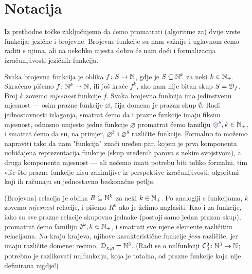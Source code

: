 \section{Notacija}

Iz prethodne točke zaključujemo da ćemo promatrati (algoritme za) dvije vrste funkcija: jezične i brojevne. Brojevne funkcije su nam važnije i uglavnom ćemo raditi s njima, ali na nekoliko mjesta dobro će nam doći i formalizacija izračunljivosti jezičnih funkcija.

Svaka brojevna funkcija je oblika $f\colon S\to{\mathbb N}$, gdje je $S\subseteq{\mathbb N}^k$ za neki $k\in{\mathbb N}_+$. Skraćeno pišemo $f\colon{\mathbb N}^k\rightharpoonup{\mathbb N}$, ili još kraće $f^k$, ako nam nije bitan skup $S=\mathcal D_{f}$. Broj $k$ zovemo \emph{mjesnost} funkcije $f$. Svaka brojevna funkcija ima jedinstvenu mjesnost --- osim prazne funkcije $\varnothing$, čija domena je prazan skup $\emptyset$. Radi jednostavnosti izlaganja, smatrat ćemo da i prazne funkcije imaju fiksnu mjesnost, odnosno umjesto jedne funkcije $\varnothing$ promatrat ćemo familiju $\varnothing^k,k\in\N_+$, i smatrat ćemo da su, na primjer, $\varnothing^3$ i $\varnothing^8$ različite funkcije. Formalno to možemo napraviti tako da nam "funkcija" znači uređen par, kojem je prva komponenta uobičajena reprezentacija funkcije (skup uređenih parova s nekim svojstvom), a druga komponenta mjesnost --- ali nećemo imati potrebu biti toliko formalni, tim više što prazne funkcije nisu zanimljive iz perspektive izračunljivosti: algoritmi koji ih računaju su jednostavno beskonačne petlje.

(Brojevna) relacija je oblika $R\subseteq{\mathbb N}^k$ za neki $k\in{\mathbb N}_+$. Po analogiji s funkcijama, $k$ zovemo \emph{mjesnost} relacije, i pišemo $R^k$ ako je želimo naglasiti. Kao i za funkcije, iako su sve prazne relacije skupovno jednake (postoji samo jedan prazan skup), promatrat ćemo familiju $\emptyset^k,k\in{\mathbb N}_+$, i smatrati sve njene elemente različitim relacijama. Na kraju krajeva, njihove karakteristične funkcije \emph{jesu} različite, jer imaju različite domene: recimo, $\mathcal D_{\chi_{\emptyset^3}}\!={\mathbb N}^3$. (Radi se o nulfunkciji $\f C_0^3\colon\N^3\to\N$; potrebno je razlikovati nulfunkciju, koja je totalna, od prazne funkcije koja nije definirana nigdje!)

